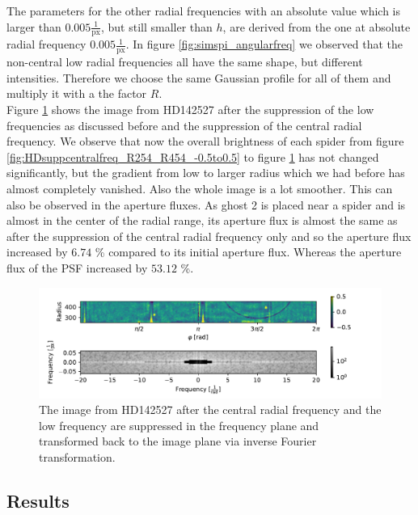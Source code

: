 The parameters for the other radial frequencies with an absolute value which is larger than $0.005 \frac{1}{\mathrm{px}}$, but still smaller than $h$, are derived from the one at absolute radial frequency $0.005 \frac{1}{\mathrm{px}}$. In figure \ref{fig:simspi_angularfreq} we observed that the non-central low radial frequencies all have the same shape, but different intensities. Therefore we choose the same Gaussian profile for all of them and multiply it with a the factor $R$.\\
Figure \ref{fig:HDsupplowfreq_R254_R454_-0.5to0.5.pdf} shows the image from HD142527 after the suppression of the low frequencies as discussed before and the suppression of the central radial frequency. We observe that now the overall brightness of each spider from figure \ref{fig:HDsuppcentralfreq_R254_R454_-0.5to0.5} to figure \ref{fig:HDsupplowfreq_R254_R454_-0.5to0.5.pdf} has not changed significantly, but the gradient from low to larger radius which we had before has almost completely vanished. Also the whole image is a lot smoother. This can also be observed in the aperture fluxes. As ghost 2 is placed near a spider and is almost in the center of the radial range, its aperture flux is almost the same as after the suppression of the central radial frequency only and so the aperture flux increased by $6.74$ \% compared to its initial aperture flux. Whereas the aperture flux of the PSF increased by $53.12$ \%. 
\begin{figure}[H]
	\centering
		\includegraphics[width=1.1\textwidth]{pics/HDsupplowfreq_R254_R454_-0.5to0.5.pdf}
		\caption{The image from HD142527 after the central radial frequency and the low frequency are suppressed in the frequency plane and transformed back to the image plane via inverse Fourier transformation.}
		\label{fig:HDsupplowfreq_R254_R454_-0.5to0.5.pdf}
\end{figure}

\subsection{Results}

